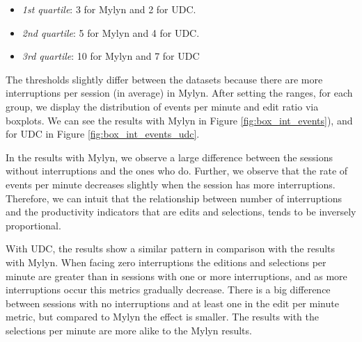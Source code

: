 \documentclass[times]{smrauth}
\begin{document}
\begin{itemize}
	\item \textit{1st quartile}: 3 for Mylyn and 2 for UDC.
	\item \textit{2nd quartile}: 5 for Mylyn and 4 for UDC.
	\item \textit{3rd quartile}: 10 for Mylyn and 7 for UDC
\end{itemize}

The thresholds slightly differ between the datasets because there are more interruptions per session (in average) in Mylyn. After setting the ranges, for each group, we display the distribution of events per minute and edit ratio via boxplots. We can see the results with Mylyn in Figure \ref{fig:box_int_events}), and for UDC in Figure \ref{fig:box_int_events_udc}.

In the results with Mylyn, we observe a large difference between the sessions without interruptions and the ones who do. Further, we observe that the rate of events per minute decreases slightly when the session has more interruptions. Therefore, we can intuit that the relationship between number of interruptions and the productivity indicators that are edits and selections, tends to be inversely proportional. 

With UDC, the results show a similar pattern in comparison with the results with Mylyn. When facing zero interruptions the editions and selections per minute are greater than in sessions with one or more interruptions, and as more interruptions occur this metrics gradually decrease. There is a big difference between sessions with no interruptions and at least one in the edit per minute metric, but compared to Mylyn the effect is smaller. The results with the selections per minute are more alike to the Mylyn results.


\end{document}
